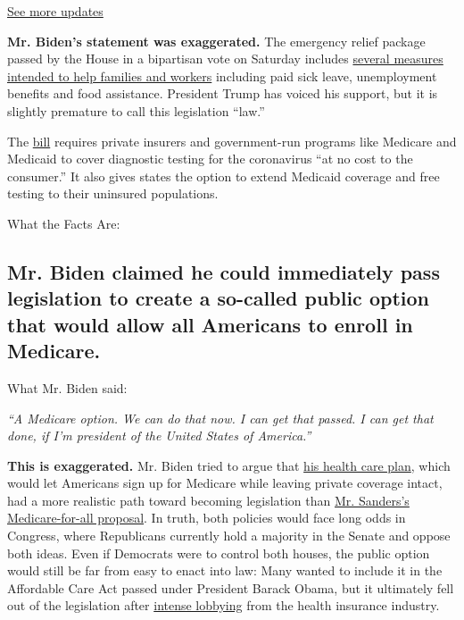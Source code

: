 \href{https://www.nytimes.com/2020/07/31/us/elections/biden-vs-trump.html?action=click\&pgtype=Article\&state=default\&region=MAIN_CONTENT_1\&context=storylines_live_updates}{See
more updates}

\textbf{Mr. Biden's statement was exaggerated.} The emergency relief
package passed by the House in a bipartisan vote on Saturday includes
\href{https://www.nytimes.com/2020/03/14/us/politics/congress-coronavirus-bill.html}{several
measures intended to help families and workers} including paid sick
leave, unemployment benefits and food assistance. President Trump has
voiced his support, but it is slightly premature to call this
legislation ``law.''

The
\href{https://appropriations.house.gov/sites/democrats.appropriations.house.gov/files/Families\%20First\%20summary.pdf\#page=7}{bill}
requires private insurers and government-run programs like Medicare and
Medicaid to cover diagnostic testing for the coronavirus ``at no cost to
the consumer.'' It also gives states the option to extend Medicaid
coverage and free testing to their uninsured populations.

What the Facts Are:

\hypertarget{mr-biden-claimed-he-could-immediately-pass-legislation-to-create-a-so-called-public-option-that-would-allow-all-americans-to-enroll-in-medicare}{%
\subsection{Mr. Biden claimed he could immediately pass legislation to
create a so-called public option that would allow all Americans to
enroll in
Medicare.}\label{mr-biden-claimed-he-could-immediately-pass-legislation-to-create-a-so-called-public-option-that-would-allow-all-americans-to-enroll-in-medicare}}

What Mr. Biden said:

\emph{``A Medicare option. We can do that now. I can get that passed. I
can get that done, if I'm president of the United States of America.''}

\textbf{This is exaggerated.} Mr. Biden tried to argue that
\href{https://www.nytimes.com/2019/07/15/us/politics/biden-health-care.html}{his
health care plan}, which would let Americans sign up for Medicare while
leaving private coverage intact, had a more realistic path toward
becoming legislation than
\href{https://www.nytimes.com/2019/06/27/us/politics/bernie-sanders-medicare-for-all.html}{Mr.
Sanders's Medicare-for-all proposal}. In truth, both policies would face
long odds in Congress, where Republicans currently hold a majority in
the Senate and oppose both ideas. Even if Democrats were to control both
houses, the public option would still be far from easy to enact into
law: Many wanted to include it in the Affordable Care Act passed under
President Barack Obama, but it ultimately fell out of the legislation
after
\href{https://www.nytimes.com/2009/06/11/us/politics/11health.html}{intense
lobbying} from the health insurance industry.

